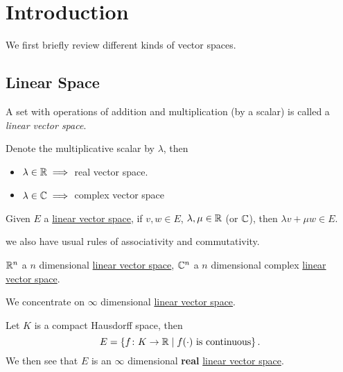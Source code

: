 \chapter{Introduction}

We first briefly review different kinds of vector spaces.

\section{Linear Space}

\begin{definition}\label{def:linear-vector-space}
	A set with operations of addition and multiplication (by a scalar) is called a \emph{linear vector space}.
\end{definition}

\begin{eg}
	Denote the multiplicative scalar by \(\lambda \), then
	\begin{itemize}
		\item \(\lambda \in \mathbb{\MakeUppercase{r}} \implies\) real vector space.
		\item \(\lambda \in \mathbb{\MakeUppercase{c}} \implies \) complex vector space
	\end{itemize}
\end{eg}

\begin{lemma}
	Given \(E\) a \hyperref[def:linear-vector-space]{linear vector space}, if \(v, w\in E\), \(\lambda , \mu \in \mathbb{\MakeUppercase{r}} \) (or \(\mathbb{\MakeUppercase{c}} \)), then \(\lambda v + \mu w\in E\).
\end{lemma}

we also have usual rules of associativity and commutativity.

\begin{eg}
	\(\mathbb{\MakeUppercase{r}} ^n\) a \(n\) dimensional \hyperref[def:linear-vector-space]{linear vector space}, \(\mathbb{\MakeUppercase{c}} ^n\) a \(n\) dimensional complex \hyperref[def:linear-vector-space]{linear vector space}.
\end{eg}

We concentrate on \(\infty \) dimensional \hyperref[def:linear-vector-space]{linear vector space}.

\begin{eg}
	Let \(K\) is a compact Hausdorff space, then
	\[
		E = \left\{ f\colon K\to \mathbb{\MakeUppercase{r}} \mid f(\cdot) \text{ is continuous}  \right\}.
	\]
	We then see that \(E\) is an \(\infty\)	dimensional \textbf{real} \hyperref[def:linear-vector-space]{linear vector space}.
\end{eg}

